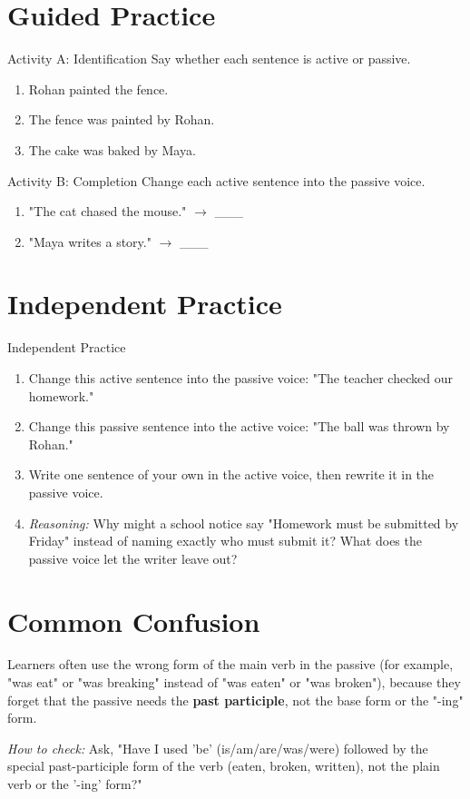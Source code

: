 \section{Guided Practice}
\begin{activitybox}{Activity A: Identification}
Say whether each sentence is active or passive.
\begin{enumerate}
    \item Rohan painted the fence.
    \item The fence was painted by Rohan.
    \item The cake was baked by Maya.
\end{enumerate}
\end{activitybox}

\begin{activitybox}{Activity B: Completion}
Change each active sentence into the passive voice.
\begin{enumerate}
    \item "The cat chased the mouse." $\rightarrow$ \_\_\_
    \item "Maya writes a story." $\rightarrow$ \_\_\_
\end{enumerate}
\end{activitybox}

\section{Independent Practice}
\begin{activitybox}{Independent Practice}
\begin{enumerate}
    \item Change this active sentence into the passive voice: "The teacher checked our homework."
    \item Change this passive sentence into the active voice: "The ball was thrown by Rohan."
    \item Write one sentence of your own in the active voice, then rewrite it in the passive voice.
    \item \textit{Reasoning:} Why might a school notice say "Homework must be submitted by Friday" instead of naming exactly who must submit it? What does the passive voice let the writer leave out?
\end{enumerate}
\end{activitybox}

\section{Common Confusion}
\begin{warningbox}
Learners often use the wrong form of the main verb in the passive (for example, "was eat" or "was breaking" instead of "was eaten" or "was broken"), because they forget that the passive needs the \textbf{past participle}, not the base form or the "-ing" form.

\textit{How to check:} Ask, "Have I used 'be' (is/am/are/was/were) followed by the special past-participle form of the verb (eaten, broken, written), not the plain verb or the '-ing' form?"
\end{warningbox}

